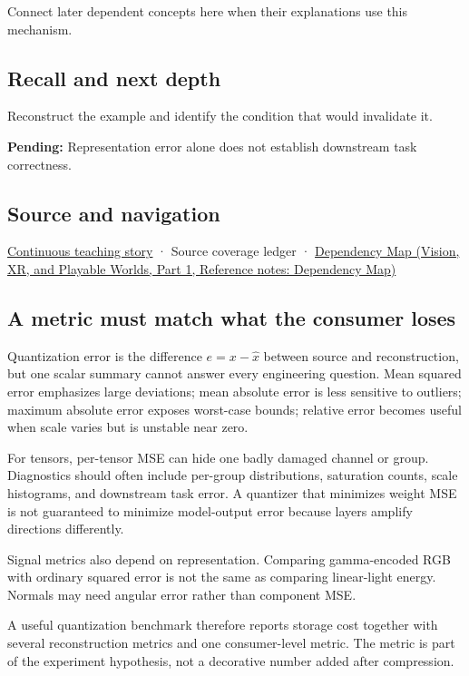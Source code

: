 \hypertarget{appendix-537171d69d27-used-by}{}

Connect later dependent concepts here when their explanations use this mechanism.

\subsection{Recall and next depth}\label{appendix-537171d69d27-recall-and-next-depth}

\hypertarget{appendix-537171d69d27-recall-and-next-depth}{}

Reconstruct the example and identify the condition that would invalidate it.

\textbf{Pending:} Representation error alone does not establish downstream task correctness.

\subsection{Source and navigation}\label{appendix-537171d69d27-source-and-navigation}

\hypertarget{appendix-537171d69d27-source-and-navigation}{}

\hyperref[01-foundations-i-ch001-choosing-what-information-to-keep]{Continuous teaching story} · {Source coverage ledger} · \href{../07-Vision-XR-and-Playable-Worlds-P01/main.pdf\#appendix-4ad47bdd269a}{Dependency Map (Vision, XR, and Playable Worlds, Part 1, Reference notes: Dependency Map)}

\subsection{A metric must match what the consumer loses}\label{appendix-537171d69d27-a-metric-must-match-what-the-consumer-loses}

\hypertarget{appendix-537171d69d27-a-metric-must-match-what-the-consumer-loses}{}

Quantization error is the difference \(e=x-\hat x\) between source and reconstruction, but one scalar summary cannot answer every engineering question. Mean squared error emphasizes large deviations; mean absolute error is less sensitive to outliers; maximum absolute error exposes worst-case bounds; relative error becomes useful when scale varies but is unstable near zero.

For tensors, per-tensor MSE can hide one badly damaged channel or group. Diagnostics should often include per-group distributions, saturation counts, scale histograms, and downstream task error. A quantizer that minimizes weight MSE is not guaranteed to minimize model-output error because layers amplify directions differently.

Signal metrics also depend on representation. Comparing gamma-encoded RGB with ordinary squared error is not the same as comparing linear-light energy. Normals may need angular error rather than component MSE.

A useful quantization benchmark therefore reports storage cost together with several reconstruction metrics and one consumer-level metric. The metric is part of the experiment hypothesis, not a decorative number added after compression.
